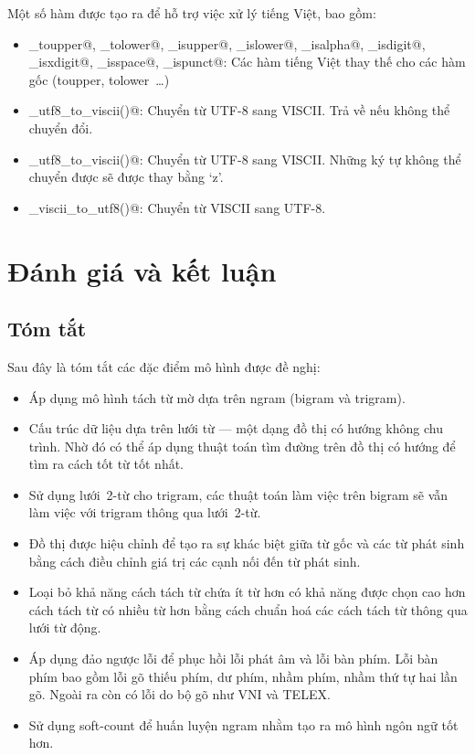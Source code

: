 \documentclass[a4paper,oneside,14pt]{extbook} %
\begin{document}
Một số hàm được tạo ra để hỗ trợ việc xử lý tiếng Việt, bao gồm:
\begin{itemize}
\item \verb@viet_toupper@, \verb@viet_tolower@, \verb@viet_isupper@, \verb@viet_islower@,
  \verb@viet_isalpha@, \verb@viet_isdigit@, \verb@viet_isxdigit@, \verb@viet_isspace@,
  \verb@viet_ispunct@: Các hàm tiếng Việt thay thế cho các hàm gốc (toupper,
  tolower~\ldots)
\item \verb@viet_utf8_to_viscii()@: Chuyển từ UTF-8 sang VISCII. Trả
  về \verb@false@ nếu không thể chuyển đổi.
\item \verb@viet_utf8_to_viscii()@: Chuyển từ UTF-8 sang VISCII. Những
  ký tự không thể chuyển được sẽ được thay bằng `z'.
\item \verb@viet_viscii_to_utf8()@: Chuyển từ VISCII sang UTF-8.
\end{itemize}



\chapter{Đánh giá và kết luận}
\label{cha:conclusion}
\minitoc

\section{Tóm tắt}

Sau đây là tóm tắt các đặc điểm mô hình được đề nghị:
\begin{itemize}
\item Áp dụng mô hình tách từ mờ dựa trên ngram (bigram và trigram).
\item Cấu trúc dữ liệu dựa trên lưới từ --- một dạng đồ thị có
  hướng không chu trình. Nhờ đó có thể áp dụng thuật toán tìm đường
  trên đồ thị có hướng để tìm ra cách tốt từ tốt nhất.
\item Sử dụng lưới~2-từ cho trigram, các thuật toán làm việc trên
  bigram sẽ vẫn làm việc với trigram thông qua lưới~2-từ.
\item Đồ thị được hiệu chỉnh để tạo
  ra sự khác biệt giữa từ gốc và các từ phát sinh bằng cách điều chỉnh
  giá trị các cạnh nối đến từ phát sinh. 
\item Loại bỏ khả năng cách tách từ
  chứa ít từ hơn có khả năng được chọn cao hơn cách tách từ có nhiều từ
  hơn bằng cách chuẩn hoá các cách tách từ thông qua lưới từ động.
\item Áp dụng đảo ngược lỗi để phục hồi lỗi phát âm và lỗi bàn
  phím. Lỗi bàn phím bao gồm lỗi gõ thiếu phím, dư phím, nhầm phím,
  nhầm thứ tự hai lần gõ. Ngoài ra còn có lỗi do bộ gõ như VNI và
  TELEX.
\item Sử dụng soft-count để huấn luyện ngram nhằm tạo ra mô hình ngôn
  ngữ tốt hơn.
\end{itemize}
\end{document}
